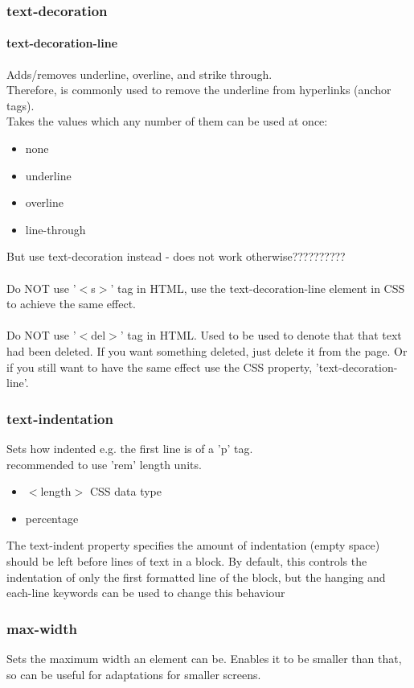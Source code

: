 \documentclass[]{article}
\begin{document}
\subsubsection{text-decoration}
\paragraph{text-decoration-line}
Adds/removes underline, overline, and strike through.
\\
Therefore, is commonly used to remove the underline from hyperlinks (anchor tags).
\\
Takes the values which any number of them can be used at once:
\begin{itemize}
	\item none
	\item underline
	\item overline
	\item line-through
\end{itemize}
But use text-decoration instead - does not work otherwise??????????
\\\\
Do NOT use '$<$s$>$' tag in HTML, use the text-decoration-line element in CSS to achieve the same effect.
\\\\
Do NOT use '$<$del$>$' tag in HTML.  Used to be used to denote that that text had been deleted.  If you want something deleted, just delete it from the page.  Or if you still want to have the same effect use the CSS property, 'text-decoration-line'.

\subsubsection{text-indentation}
Sets how indented e.g. the first line is of a 'p' tag.
\\
recommended to use 'rem' length units.  
\begin{itemize}
	\item $<$length$>$ CSS data type
	\item percentage
\end{itemize}
The text-indent property specifies the amount of indentation (empty space) should be left before lines of text in a block. By default, this controls the indentation of only the first formatted line of the block, but the hanging and each-line keywords can be used to change this behaviour

\subsubsection{max-width}
Sets the maximum width an element can be.  Enables it to be smaller than that, so can be useful for adaptations for smaller screens.
\end{document}
